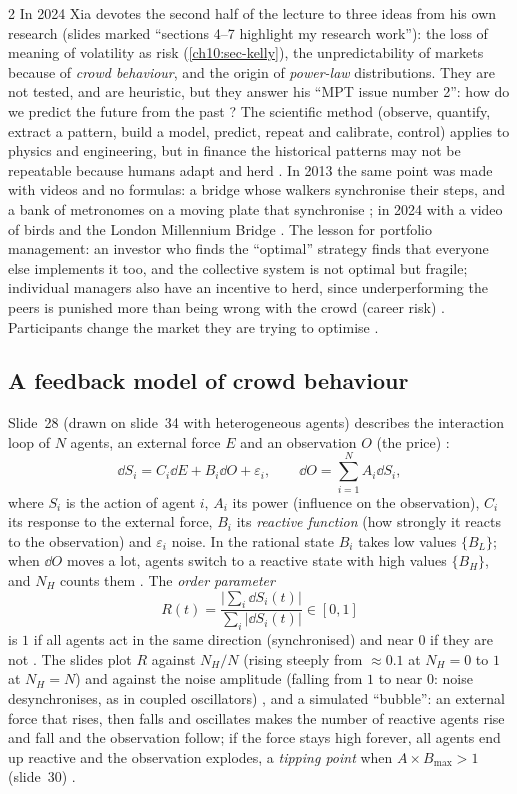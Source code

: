 \begin{paracol}{2}
In 2024 Xia devotes the second half of the lecture to three ideas from his own research (slides marked
``sections 4--7 highlight my research work''): the loss of meaning of volatility as risk (\cref{ch10:sec-kelly}), the
unpredictability of markets because of \emph{crowd behaviour}, and the origin of \emph{power-law} distributions.
They are not tested, and are heuristic, but they answer his ``MPT issue number 2'': how do we predict the future from
the past ? The scientific method (observe, quantify, extract a pattern, build a model, predict,
repeat and calibrate, control) applies to physics and engineering, but in finance the historical patterns may not
be repeatable because humans adapt and herd . In 2013 the same point was
made with videos and no formulas: a bridge whose walkers synchronise their steps, and a bank of metronomes on a
moving plate that synchronise ; in 2024 with a video of birds
 and the London Millennium Bridge . The lesson for portfolio management: an
investor who finds the ``optimal'' strategy finds that everyone else implements it too, and the collective system
is not optimal but fragile; individual managers also have an incentive to herd, since underperforming the peers is
punished more than being wrong with the crowd (career risk)
. Participants change the market they are trying to optimise .

\subsection{A feedback model of crowd behaviour}
Slide~28 (drawn on slide~34 with heterogeneous agents) describes the interaction loop of $N$ agents, an external force
$E$ and an observation $O$ (the price) :
\begin{equation}\label{ch10:eq-crowd}
  \dd S_i=C_i\dd E+B_i\dd O+\varepsilon_i,\qquad \dd O=\sum_{i=1}^NA_i\dd S_i ,
\end{equation}
where $S_i$ is the action of agent $i$, $A_i$ its power (influence on the observation), $C_i$ its response to the
external force, $B_i$ its \emph{reactive function} (how strongly it reacts to the observation) and $\varepsilon_i$
noise. In the rational state $B_i$ takes low values $\{B_L\}$; when $\dd O$ moves a lot, agents switch to a reactive
state with high values $\{B_H\}$, and $N_H$ counts them . The \emph{order parameter}
\[
  R(t)=\frac{\bigl|\sum_i\dd S_i(t)\bigr|}{\sum_i|\dd S_i(t)|}\in[0,1]
\]
is $1$ if all agents act in the same direction (synchronised) and near $0$ if they are not .
The slides plot $R$ against $N_H/N$ (rising steeply from $\approx0.1$ at $N_H=0$ to $1$ at $N_H=N$) and against the noise
amplitude (falling from $1$ to near $0$: noise desynchronises, as in coupled oscillators)
, and a simulated ``bubble'': an external force that rises, then falls and oscillates makes the
number of reactive agents rise and fall and the observation follow; if the force stays high forever, all agents end up
reactive and the observation explodes, a \emph{tipping point} when $A\times B_{\max}>1$ (slide~30)
.


\end{paracol}
